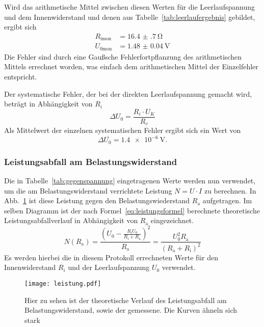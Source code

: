 Wird das arithmetische Mittel zwischen diesen 
Werten für die Leerlaufspannung und dem Innenwiderstand 
und denen aus Tabelle~\ref{tab:leerlaufergebnis} gebildet, 
ergibt sich 
\begin{align*}
R_\text{imon}&=\SI{16.4(7)}{\ohm}\\
U_\text{0mon}&=\SI{1.48(4)}{\volt}
\end{align*}
Die Fehler sind durch eine Gaußsche Fehlerfortpflanzung des arithmetischen 
Mittels errechnet worden, was einfach dem arithmetischen Mittel der 
Einzelfehler entspricht.


Der systematische Fehler, der bei der direkten Leerlaufspannung 
gemacht wird, beträgt in Abhängigkeit von $R_{i}$
\begin{equation*}
\Delta U_{0} = \frac{R_{i}\cdot U_{K}}{R_{v}}
\end{equation*}
Als Mittelwert der einzelnen systematischen Fehler ergibt sich ein 
Wert von 
\begin{equation*}
\Delta \overline{U_{0}} = \SI{1.4e-6}{\volt}.
\end{equation*}
%
\subsubsection{Leistungsabfall am Belastungswiderstand}
Die in Tabelle~\ref{tab:gegenspannung} eingetragenen Werte werden nun 
verwendet, um die am Belastungswiderstand verrichtete Leistung 
$N = U\cdot I$ zu berechnen. In Abb.~\ref{fig:leistung} ist diese Leistung 
gegen den Belastungswiederstand $R_\text{a}$ aufgetragen. 
Im selben Diagramm ist der nach Formel~\eqref{eq:leistungsformel} 
berechnete theoretische Leistungsabfallverlauf in Abhängigkeit von 
$R_\text{a}$ eingezeichnet.
\begin{equation}
\label{eq:leistungsformel}
N(R_\text{a})=\frac{(U_{0}-\frac{R_\text{i}U_{0}}
{R_\text{i}+R_\text{a}})^2}{R_\text{a}} = \frac{U_{0}^2R_\text{a}}
{(R_\text{a} + R_\text{i})^2}
\end{equation}
Es werden hierbei die in diesem Protokoll errechneten Werte für den 
Innenwiderstand $R_{i}$ und der Leerlaufspannung $U_{0}$ 
verwendet.

\begin{figure}
\centering
\texttt{[image: leistung.pdf]}
\caption{Hier zu sehen ist der theoretische Verlauf des Leistungsabfall 
am Belastungswiderstand, sowie der gemessene. Die Kurven ähneln sich 
stark}
\label{fig:leistung}
\end{figure}
\FloatBarrier
